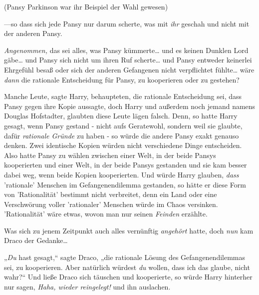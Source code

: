 {(Pansy Parkinson war ihr Beispiel der Wahl gewesen)

—so dass sich jede Pansy nur darum scherte, was mit \emph{ihr} geschah und nicht mit der anderen Pansy.

\emph{Angenommen,} das sei alles, was Pansy kümmerte… und es keinen Dunklen Lord gäbe… und Pansy sich nicht um ihren Ruf scherte… und Pansy entweder keinerlei Ehrgefühl besaß oder sich der anderen Gefangenen nicht verpflichtet fühlte… wäre \emph{dann} die rationale Entscheidung für Pansy, zu kooperieren oder zu gestehen?

Manche Leute, sagte Harry, behaupteten, die rationale Entscheidung sei, dass Pansy gegen ihre Kopie aussagte, doch Harry und außerdem noch jemand namens Douglas Hofstadter, glaubten diese Leute lägen falsch. Denn, so hatte Harry gesagt, wenn Pansy gestand - nicht aufs Geratewohl, sondern weil sie glaubte, dafür \emph{rationale Gründe} zu haben - so würde die andere Pansy exakt genauso denken. Zwei identische Kopien würden nicht verschiedene Dinge entscheiden. Also hatte Pansy zu wählen zwischen einer Welt, in der beide Pansys kooperierten und einer Welt, in der beide Pansys gestanden und sie kam besser dabei weg, wenn beide Kopien kooperierten. Und würde Harry glauben, \emph{dass} 'rationale' Menschen im Gefangenendilemma gestanden, so hätte er diese Form von 'Rationalität' bestimmt nicht verbreitet, denn ein Land oder eine Verschwörung voller 'rationaler' Menschen würde im Chaos versinken. 'Rationalität' wäre etwas, wovon man nur seinen \emph{Feinden} erzählte.

Was sich zu jenem Zeitpunkt auch alles vernünftig \emph{angehört} hatte, doch \emph{nun} kam Draco der Gedanke…

„\emph{Du} hast gesagt,“ sagte Draco, „die rationale Lösung des Gefangenendilemmas sei, zu kooperieren. Aber natürlich würdest \emph{du} wollen, dass ich das glaube, nicht wahr?“ Und ließe Draco sich täuschen und kooperierte, so würde Harry hinterher nur sagen, \emph{Haha, wieder reingelegt!} und ihn auslachen.

}
